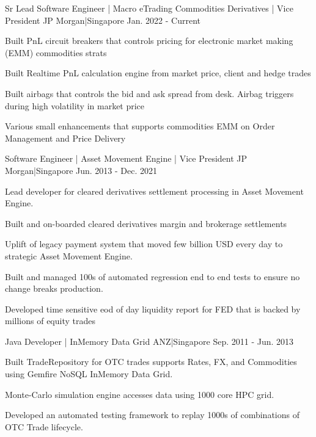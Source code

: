 \begin{cventries}
    {Sr Lead Software Engineer | Macro eTrading Commodities Derivatives | Vice President }
    {JP Morgan|Singapore}
    {Jan. 2022 - Current}
    {
      \begin{cvitems}
        \item {Built PnL circuit breakers that controls pricing for electronic market making (EMM) commodities strats}
        \item {Built Realtime PnL calculation engine from market price, client and hedge trades }
        \item {Built airbags that controls the bid and ask spread from desk. Airbag triggers during high volatility in market price }
        \item {Various small enhancements that supports commodities EMM on Order Management and Price Delivery}
      \end{cvitems}
    }
    {Software Engineer |  Asset Movement Engine | Vice President }
    {JP Morgan|Singapore}
    {Jun. 2013 - Dec. 2021}
    {
      \begin{cvitems}
        \item {Lead developer for cleared derivatives settlement processing in Asset Movement Engine.}
        \item {Built and on-boarded cleared derivatives margin and brokerage settlements}
        \item {Uplift of legacy payment system that moved few billion USD every day to strategic Asset Movement Engine.}
        \item {Built and managed 100s of automated regression end to end tests to ensure no change breaks production. }
        \item {Developed time sensitive eod of day liquidity report for FED that is backed by millions of equity trades }
      \end{cvitems}
    }
    {Java Developer | InMemory Data Grid}
    {ANZ|Singapore}
    {Sep. 2011 - Jun. 2013}
    {
      \begin{cvitems}
        \item {Built TradeRepository for OTC trades  supports Rates, FX, and Commodities using Gemfire NoSQL InMemory Data Grid.}
        \item {Monte-Carlo simulation engine accesses data using 1000 core HPC grid.}
        \item {Developed an automated testing framework to replay 1000s of combinations of OTC Trade lifecycle.}

\end{cvitems}}
\end{cventries}
